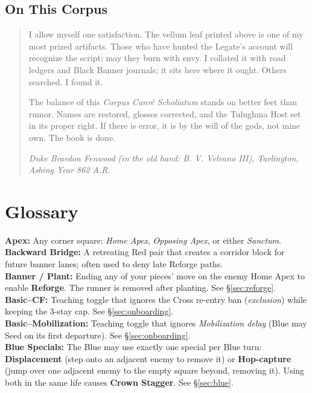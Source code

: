 \documentclass[11pt]{article}
\begin{document}
\subsection*{On This Corpus}
\begin{quote}\small
I allow myself one satisfaction. The vellum leaf printed above is one of my most prized artifacts. Those who have hunted the Legate’s account will recognize the script; may they burn with envy. I collated it with road ledgers and Black Banner journals; it sits here where it ought. Others searched. I found it.

The balance of this \emph{Corpus Canré Scholiatum} stands on better feet than rumor. Names are restored, glosses corrected, and the Tulughma Host set in its proper right. If there is error, it is by the will of the gods, not mine own. The book is done.

\hfill\emph{Duke Braedon Fenwood (in the old hand: B. V. Velvano III), Tarlington, Ashing Year 862 A.R.}
\end{quote}

\clearpage
\section*{Glossary}
\label{sec:glossary}
{}

\textbf{Apex:} Any corner square: \emph{Home Apex}, \emph{Opposing Apex}, or either \emph{Sanctum}.\\

\textbf{Backward Bridge:} A retreating Red pair that creates a corridor block for future banner lanes; often used to deny late Reforge paths.\\

\textbf{Banner / Plant:} Ending any of your pieces' move on the enemy Home Apex to enable \textbf{Reforge}. The runner is removed after planting. See \S\ref{sec:reforge}.\\

\textbf{Basic–CF:} Teaching toggle that ignores the Cross re-entry ban (\emph{exclusion}) while keeping the 3-stay cap. See \S\ref{sec:onboarding}.\\

\textbf{Basic–Mobilization:} Teaching toggle that ignores \emph{Mobilization delay} (Blue may Seed on its first departure). See \S\ref{sec:onboarding}.\\

\textbf{Blue Specials:} The Blue may use exactly one special per Blue turn: \textbf{Displacement} (step onto an adjacent enemy to remove it) or \textbf{Hop-capture} (jump over one adjacent enemy to the empty square beyond, removing it). Using both in the same life causes \textbf{Crown Stagger}. See \S\ref{sec:blue}.\\
\end{document}
